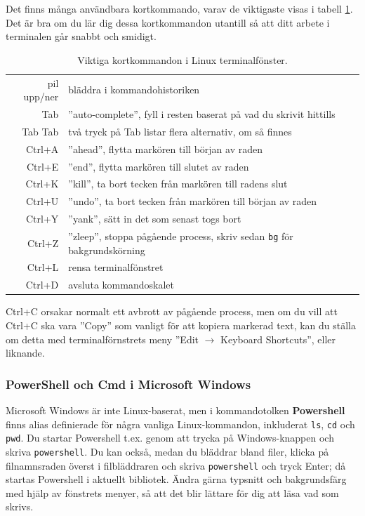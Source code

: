 Det finns många användbara kortkommando, varav de viktigaste visas i tabell \ref{fig:terminal:shortcuts}. Det är bra om du lär dig dessa kortkommandon utantill så att ditt arbete i terminalen går snabbt och smidigt.

\begin{table}[H]
\renewcommand{\arraystretch}{1.15}
\begin{tabular}{@{}r | l}
pil upp/ner & bläddra i kommandohistoriken \\
Tab & ''auto-complete'', fyll i resten baserat på vad du skrivit hittills \\
Tab Tab & två tryck på Tab listar flera alternativ, om så finnes \\
Ctrl+A & ''ahead'', flytta markören till början av raden \\
Ctrl+E & ''end'', flytta markören till slutet av raden \\
Ctrl+K & ''kill'', ta bort tecken från markören till radens slut\\
Ctrl+U & ''undo'', ta bort tecken från markören till början av raden \\
Ctrl+Y & ''yank'', sätt in det som senast togs bort\\
Ctrl+Z & ''zleep'', stoppa pågående process, skriv sedan \texttt{bg} för bakgrundskörning\\
Ctrl+L & rensa terminalfönstret\\
Ctrl+D & avsluta kommandoskalet \\
\end{tabular}
    \caption{Viktiga kortkommandon i Linux terminalfönster.}
    \label{fig:terminal:shortcuts}
\end{table}

\noindent Ctrl+C orsakar normalt ett avbrott av pågående process, men om du vill att Ctrl+C ska vara ''Copy'' som vanligt för att kopiera markerad text, kan du ställa om detta med terminalförnstrets  meny ''Edit $\rightarrow$ Keyboard Shortcuts'', eller liknande.




 
\subsubsection{PowerShell och Cmd i Microsoft Windows}
Microsoft Windows är inte Linux-baserat, men i kommandotolken \textbf{Powershell} finns alias definierade för några vanliga Linux-kommandon, inkluderat \texttt{ls}, \texttt{cd} och \texttt{pwd}. 
Du startar Powershell t.ex. genom att trycka på Windows-knappen och skriva \texttt{powershell}. 
Du kan också, medan du bläddrar bland filer, klicka på filnamnsraden överst i filbläddraren och skriva \texttt{powershell} och tryck Enter; då startas Powershell i aktuellt bibliotek. Ändra gärna typsnitt och bakgrundsfärg med hjälp av fönstrets menyer, så att det blir lättare för dig att läsa vad som skrivs.

